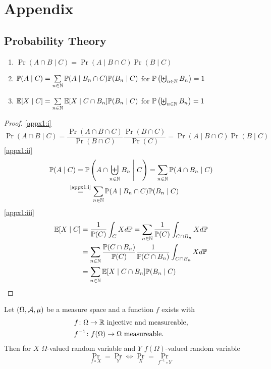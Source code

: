 \chapter{Appendix}
\section{Probability Theory}
\begin{lemma}\leavevmode \label{appx1}
    \begin{enumerate}[label=(\roman*), font=\normalfont]
        \item\label{appx1:i} \(\Pr(A\cap B\mid C) = \Pr(A \mid B \cap C)\Pr(B\mid C) \)
        \item\label{appx1:ii} \(\mathbb{P}(A\mid C)=\sum\limits_{n\in\mathbb{N}} \mathbb{P}(A \mid B_n \cap C)\mathbb{P}(B_n\mid C)  \)
        for  \(\mathbb{P}\left(\biguplus_{n\in\mathbb{N}}B_n\right)=1 \)
        \item\label{appx1:iii} \(\mathbb{E}[X\mid C]=\sum\limits_{n\in\mathbb{N}} \mathbb{E}[X\mid C \cap B_n] \mathbb{P}(B_n \mid C) \) for  \(\mathbb{P}\left(\biguplus_{n\in\mathbb{N}}B_n\right)=1 \)
    \end{enumerate}
\end{lemma}
\begin{proof}
    \ref{appx1:i}
    \[
        \Pr(A\cap B\mid C)
        =\frac{\Pr(A\cap B\cap C)}{\Pr(B\cap C)}\frac{\Pr(B\cap C)}{\Pr(C)}
        =\Pr(A\mid B\cap C)\Pr(B\mid C)
    \]
    \ref{appx1:ii}
    \begin{align*}
        \Pr(A\mid C)&=\Pr\left(A\cap \biguplus_{n\in\N} B_n \;\middle|\; C\right)
        =\sum_{n\in\N} \Pr(A\cap B_n\mid C)\\
        &\lxeq{\text{\ref{appx1:i}}} \sum_{n\in\N} \Pr(A \mid B_n \cap C)\Pr(B_n\mid C)
    \end{align*}
    \ref{appx1:iii}
    \begin{align*}
        \mathbb{E}[X\mid C]
        &=\frac{1}{\mathbb{P}(C)} \int_C X d\mathbb{P} 
        =\sum_{n\in\mathbb{N}}\frac{1}{\mathbb{P}(C)} \int_{C\cap B_n} X d\mathbb{P}\\
        &=\sum_{n\in\mathbb{N}} \frac{\mathbb{P}(C\cap B_n)}{\mathbb{P}(C)} \frac{1}{\mathbb{P}(C\cap B_n)} 
        \int_{C\cap B_n} X d\mathbb{P} \\
        &=\sum_{n\in\mathbb{N}}\mathbb{E}[X\mid C\cap B_n]\mathbb{P}(B_n\mid C) \qedhere
    \end{align*}
\end{proof}
\begin{lemma}\label{appx2}
    Let \((\Omega,\mathcal{A},\mu)\) be a measure space and a function \(f\) exists with
    \begin{align*}
        &f\colon \Omega \to \mathbb{R} \text{ injective and measureable,} \\
        &f^{-1}\colon f(\Omega)\to \Omega \text{ measureable.}
    \end{align*}
    Then for \(X\) \(\Omega\)-valued random variable and
    \(Y\) \(f(\Omega)\)-valued random variable
    \[
        \Pr_{f\circ X} =\Pr_Y \iff \Pr_X=\Pr_{f^{-1}\circ Y}
    \]
\end{lemma}

